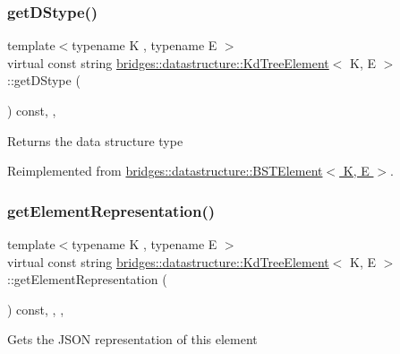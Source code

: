 \subsubsection{\texorpdfstring{get\+D\+Stype()}{getDStype()}}
{\footnotesize\ttfamily template$<$typename K , typename E $>$ \\
virtual const string \hyperlink{classbridges_1_1datastructure_1_1_kd_tree_element}{bridges\+::datastructure\+::\+Kd\+Tree\+Element}$<$ K, E $>$\+::get\+D\+Stype (\begin{DoxyParamCaption}{ }\end{DoxyParamCaption}) const\hspace{0.3cm}{\ttfamily [inline]}, {\ttfamily [override]}, {\ttfamily [virtual]}}

\begin{DoxyReturn}{Returns}
the data structure type 
\end{DoxyReturn}


Reimplemented from \hyperlink{classbridges_1_1datastructure_1_1_b_s_t_element_a2bb8cc9ec4b6bc5b89ecef0f17be366f}{bridges\+::datastructure\+::\+B\+S\+T\+Element$<$ K, E $>$}.

\mbox{\label{classbridges_1_1datastructure_1_1_kd_tree_element_a5413ecaf152e3df5fb45dd85da812888}} 
\subsubsection{\texorpdfstring{get\+Element\+Representation()}{getElementRepresentation()}}
{\footnotesize\ttfamily template$<$typename K , typename E $>$ \\
virtual const string \hyperlink{classbridges_1_1datastructure_1_1_kd_tree_element}{bridges\+::datastructure\+::\+Kd\+Tree\+Element}$<$ K, E $>$\+::get\+Element\+Representation (\begin{DoxyParamCaption}{ }\end{DoxyParamCaption}) const\hspace{0.3cm}{\ttfamily [inline]}, {\ttfamily [override]}, {\ttfamily [protected]}, {\ttfamily [virtual]}}

Gets the J\+S\+ON representation of this element 

